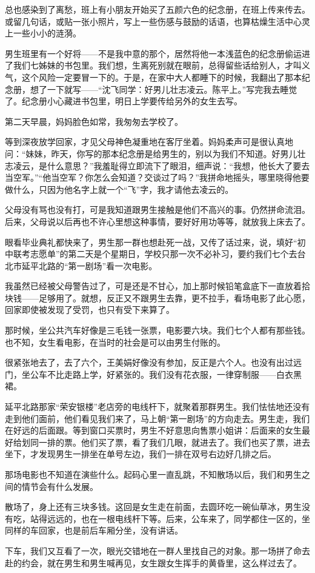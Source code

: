 \par 总也感染到了离愁，班上有小朋友开始买了五颜六色的纪念册，在班上传来传去。或留几句话，或贴一张小照片，写上一些伤感与鼓励的话语，也算枯燥生活中心灵上一些小小的涟漪。
\par 男生班里有一个好将——不是我中意的那个，居然将他一本浅蓝色的纪念册偷运进了我们七姊妹的书包里。我们想，生离死别就在眼前，总得留些话给别人，才叫义气，这个风险一定要冒一下的。于是，在家中大人都睡下的时候，我翻出了那本纪念册，想了一下就写——“沈飞同学：好男儿壮志凌云。陈平上。”写完我去睡觉了。纪念册小心藏进书包里，明日上学要传给另外的女生去写。
\par 第二天早晨，妈妈脸色如常，我匆匆去学校了。
\par 等到深夜放学回家，才见父母神色凝重地在客厅坐着。妈妈柔声可是很认真地问：“妹妹，昨天，你写的那本纪念册是给男生的，别以为我们不知道。好男儿壮志凌云，是什么意思？”我羞耻得立即流下了眼泪，细声说：“我想，他长大了要去当空军。”“他当空军？你怎么会知道？交谈过了吗？”我拼命地摇头，哪里晓得他要做什么，只因为他名字上就一个“飞”字，我才请他去凌云的。
\par 父母没有骂也没有打，可是我知道跟男生接触是他们不高兴的事。仍然拼命流泪。后来，父母说以后再也不许心里想这种事情，要好好用功等等，就放我上床去了。
\par 眼看毕业典礼都快来了，男生那一群也想赴死一战，又传了话过来，说，填好“初中联考志愿单”的第二天是个星期日，学校只那一次不必补习，要约我们七个去台北市延平北路的“第一剧场”看一次电影。
\par 我虽然已经被父母警告过了，可是还是不甘心，加上那时候铅笔盒底下一直放着拾块钱——足够用了。就想，反正又不跟男生去靠，更不拉手，看场电影了此心愿，回家即使被发现了受罚，也只有受下来算了。
\par 那时候，坐公共汽车好像是三毛钱一张票，电影要六块。我们七个人都有那些钱。也不知，女生看电影，在当时的社会是可以由男生付账的。
\par 很紧张地去了，去了六个，王美娟好像没有参加，反正是六个人。也没有出过远门，坐公车不比走路上学，好紧张的。我们没有花衣服，一律穿制服——白衣黑裙。
\par 延平北路那家“荣安银楼”老店旁的电线杆下，就聚着那群男生。我们怯怯地还没有走到他们面前，他们看见我们来了，马上朝“第一剧场”的方向走去。男生走，我们在好远的后面跟。等到窗口买票时，男生不好意思向售票小姐讲：后面来的女生最好给划同一排的票。他们买了票，看了我们几眼，就进去了。我们也买了票，进去坐下，才发现男生一排坐在单号左边，我们一排在双号右边好几排之后。
\par 那场电影也不知道在演些什么。起码心里一直乱跳，不知散场以后，我们和男生之间的情节会有什么发展。
\par 散场了，身上还有三块多钱。这回是女生走在前面，去圆环吃一碗仙草冰，男生没有吃，站得远远的，也在一根电线杆下等。后来，公车来了，同学都住一区的，坐同样的车回家，也是前后车厢分坐，没有讲话。
\par 下车，我们又互看了一次，眼光交错地在一群人里找自己的对象。那一场拼了命去赴的约会，就在男生和男生喊再见，女生跟女生挥手的黄昏里，这么样过去了。






